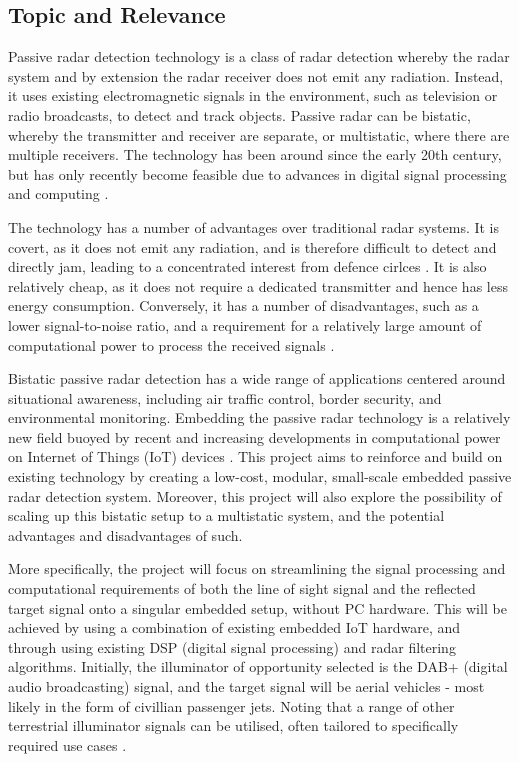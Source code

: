 \documentclass[12pt,a4paper]{article}
\begin{document}
\subsection{Topic and Relevance}
Passive radar detection technology is a class of radar detection whereby the radar system and by extension the radar receiver does not emit any radiation. Instead, it uses existing electromagnetic signals in the environment, such as television or radio broadcasts, to detect and track objects. Passive radar can be bistatic, whereby the transmitter and receiver are separate, or multistatic, where there are multiple receivers. The technology has been around since the early 20th century, but has only recently become feasible due to advances in digital signal processing and computing \cite{INTRO2017}.
\par
\vspace{0.5cm} 
\noindent The technology has a number of advantages over traditional radar systems. It is covert, as it does not emit any radiation, and is therefore difficult to detect and directly jam, leading to a concentrated interest from defence cirlces \cite{DTSO2009}. It is also relatively cheap, as it does not require a dedicated transmitter and hence has less energy consumption. Conversely, it has a number of disadvantages, such as a lower signal-to-noise ratio, and a requirement for a relatively large amount of computational power to process the received signals \cite{INTRO2017}.
\par
\vspace{0.5cm} 
\noindent Bistatic passive radar detection has a wide range of applications centered around situational awareness, including air traffic control, border security, and environmental monitoring. Embedding the passive radar technology is a relatively new field buoyed by recent and increasing developments in computational power on Internet of Things (IoT) devices \cite{IOTpassiveRadar}. This project aims to reinforce and build on existing technology by creating a low-cost, modular, small-scale embedded passive radar detection system. Moreover, this project will also explore the possibility of scaling up this bistatic setup to a multistatic system, and the potential advantages and disadvantages of such. 

\par
\vspace{0.5cm} 
\noindent More specifically, the project will focus on streamlining the signal processing and computational requirements of both the line of sight signal and the reflected target signal onto a singular embedded setup, without PC hardware. This will be achieved by using a combination of existing embedded IoT hardware, and through using existing DSP (digital signal processing) and radar filtering algorithms. Initially, the illuminator of opportunity selected is the DAB+ (digital audio broadcasting) signal, and the target signal will be aerial vehicles - most likely in the form of civillian passenger jets. Noting that a range of other terrestrial illuminator signals can be utilised, often tailored to specifically required use cases \cite{DABsignal}.
\end{document}
